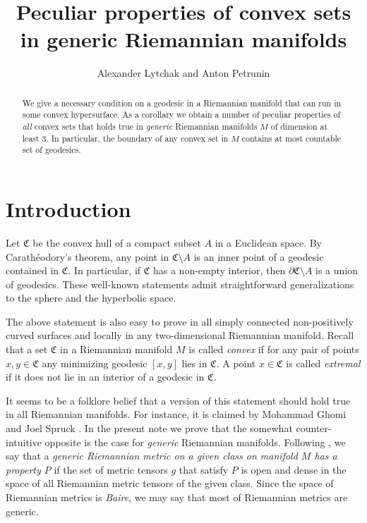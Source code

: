 \documentclass[a4paper,10pt]{article}
\begin{document}
 
\title{Peculiar properties of convex sets in generic Riemannian manifolds}
\author{Alexander Lytchak and Anton Petrunin}
\date{}
\maketitle

\begin{abstract}
We give a necessary condition on a geodesic in a Riemannian manifold that can run in some convex hypersurface.
As a corollary we obtain a number of peculiar properties of \emph{all} convex sets that holds true in \emph{generic} Riemannian manifolds $M$ of dimension at least 3.
In particular, the boundary of any convex set in $M$ contains at most countable set of geodesics.
\end{abstract}

\section{Introduction}
Let $\mathfrak{C}$ be the convex hull of a compact subset $A$ in a Euclidean space.
By Carathéodory's theorem, any point in $\mathfrak{C}\setminus A$ is an inner point of a geodesic contained in $\mathfrak{C}$.
In particular, if $\mathfrak{C}$ has a non-empty interior, then $\partial \mathfrak{C} \setminus A$ is  a union of geodesics.  
These well-known statements admit straightforward generalizations to the sphere and the hyperbolic space.
 
The above statement is also easy to prove in all simply connected non-positively curved surfaces and locally in any two-dimensional Riemannian manifold.
Recall that a set $\mathfrak{C}$ in a Riemannian manifold $M$ is called \emph{convex} if for any pair of points $x,y\in \mathfrak{C}$ any minimizing geodesic $[x,y]$ lies in $\mathfrak{C}$.
A point $x\in \mathfrak{C}$ is called \emph{extremal} if it does not lie in an interior of a geodesic in $\mathfrak{C}$.

It seems to be a folklore belief that a version of this statement should hold true in all Riemannian manifolds. 
For instance, it is claimed by Mohammad Ghomi and Joel Spruck \cite[Lemma 9.1]{Ghomi}.
In the present note we prove that the somewhat counter-intuitive opposite is the case for \emph{generic} Riemannian manifolds. 
Following \cite{eliashberg-mishachev}, we say that a \emph{generic Riemannian metric on a given class on manifold $M$ 
has a property $P$} if the set of metric tensors $g$ that satisfy $P$ is open and dense in the space of all Riemannian metric tensors of the given class.
Since the space of Riemannian metrics is \emph{Baire}, we may say that most of Riemannian metrics are generic.
\end{document}
